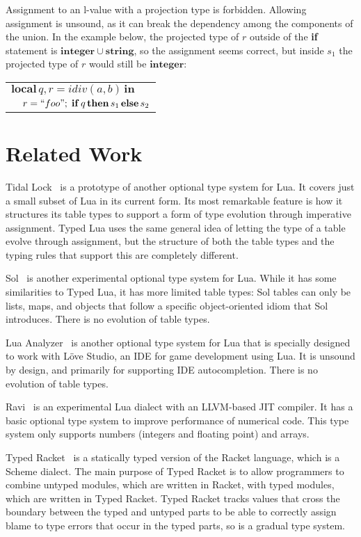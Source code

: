 \documentclass[preprint]{sigplanconf}
\newcommand{\Integer}{\mathbf{integer}}
\newcommand{\String}{\mathbf{string}}
\begin{document}
Assignment to an l-value with a projection type is forbidden. Allowing assignment is unsound, as it can break the dependency among the components of the union. In the example below,
the projected type of $r$ outside of the {\bf if} statement
is $\Integer \cup \String$, so the assignment seems correct,
but inside $s_1$ the projected type of $r$ would still be
$\Integer$:
\begin{center}
	\begin{tabular}{ll}
		\multicolumn{2}{l}{$\mathbf{local} \, q, r = idiv(a, b) \, \mathbf{in}$} \\
		&  $r = ``foo" ;\; \mathbf{if} \, q \, \mathbf{then} \, s_1 \, \mathbf{else} \, s_2$
	\end{tabular}
\end{center}

\section{Related Work}
\label{sec:related}

Tidal Lock~\cite{tidallock} is a prototype of another optional type system for Lua. It covers just a small subset of Lua
in its current form. Its most remarkable feature is
how it structures its table types to support a form of type
evolution through imperative assignment. Typed Lua uses
the same general idea of letting the type of a table evolve
through assignment, but the structure of both the table types
and the typing rules that support this are completely different.

Sol~\cite{sol} is another experimental optional type system
for Lua. While it has some similarities to Typed Lua, it
has more limited table types: Sol tables can only be lists,
maps, and objects that follow a specific object-oriented
idiom that Sol introduces. There is no evolution of table
types.

Lua Analyzer~\cite{luaanalyzer} is another optional type
system for Lua that is specially designed to work with
Löve Studio, an IDE for game development using Lua.
It is unsound by design, and primarily for supporting
IDE autocompletion. There is no evolution of table types.

Ravi~\cite{ravi} is an experimental Lua dialect
with an LLVM-based JIT compiler. It has a basic
optional type system to improve performance
of numerical code. This type system only supports
numbers (integers and floating point) and arrays.

Typed Racket~\cite{tobin-hochstadt2008ts} is a statically typed version of the Racket language, which is a Scheme dialect.
The main purpose of Typed Racket is to allow programmers to combine untyped modules, which are written in Racket, with typed modules, which are written in Typed Racket. Typed Racket tracks
values that cross the boundary between the typed and
untyped parts to be able to correctly assign blame to type
errors that occur in the typed parts, so is a gradual type
system.
\end{document}
